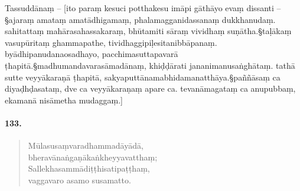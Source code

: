Tassuddānaṃ – [ito paraṃ kesuci potthakesu imāpi gāthāyo evaṃ dissanti –§ajaraṃ amataṃ amatādhigamaṃ, phalamagganidassanaṃ dukkhanudaṃ. sahitattaṃ mahārasahassakaraṃ, bhūtamiti sāraṃ vividhaṃ suṇātha.§taḷākaṃ vasupūritaṃ ghammapathe, tividhaggipiḷesitanibbāpanaṃ. byādhipanudanaosadhayo, pacchimasuttapavarā ṭhapitā.§madhumandavarasāmadānaṃ, khiḍḍārati jananimanusaṅghātaṃ. tathā sutte veyyākaraṇā ṭhapitā, sakyaputtānamabhidamanatthāya.§paññāsaṃ ca diyaḍhḍasataṃ, dve ca veyyākaraṇaṃ apare ca. tevanāmagataṃ ca anupubbaṃ, ekamanā nisāmetha mudaggaṃ.]

\paragraph{133.}\begin{verse}
  Mūlasusaṃvaradhammadāyādā, \\bheravānaṅgaṇākaṅkheyyavatthaṃ;\\
  Sallekhasammādiṭṭhisatipaṭṭhaṃ, \\vaggavaro asamo susamatto.
\end{verse}
